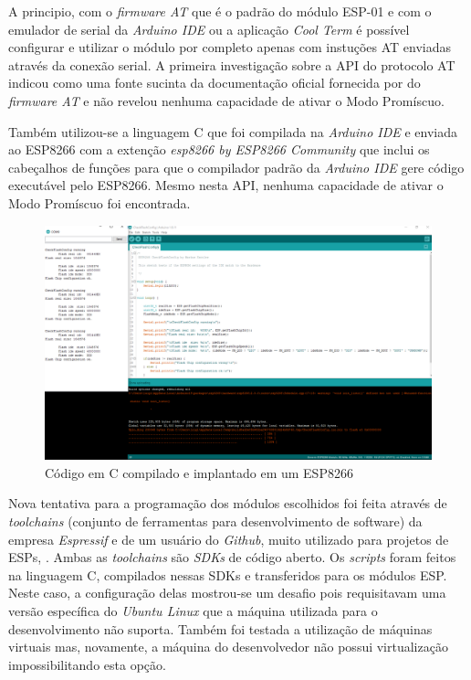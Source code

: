 A principio, com o \emph{firmware AT} que é o padrão do módulo ESP-01 e com o
emulador de serial da \emph{Arduino IDE} ou a aplicação \emph{Cool Term} é
possível configurar e utilizar o módulo por completo apenas com instuções AT
enviadas através da conexão serial. A primeira investigação sobre a API do protocolo
AT indicou  como uma fonte sucinta da documentação
oficial fornecida por  do \emph{firmware AT} e
não revelou nenhuma capacidade de ativar o Modo Promíscuo.

Também utilizou-se a linguagem C que foi compilada na \emph{Arduino IDE} e
enviada ao ESP8266 com a extenção \emph{esp8266 by ESP8266 Community} que inclui
os cabeçalhos de funções para que o compilador padrão da \emph{Arduino IDE} gere
código  executável pelo ESP8266. Mesmo nesta API, nenhuma capacidade de ativar o
Modo Promíscuo foi encontrada.

\begin{figure}[htb]
	\caption{\label{fig:esp-arduino}Código em C compilado e implantado em um ESP8266}
	\begin{center}
		\includegraphics[width=1\textwidth]{040-plataformas/esp-dev/arduino-ide.png}
	\end{center}
\end{figure}


Nova tentativa para a programação  dos módulos escolhidos foi feita através de
\emph{toolchains} (conjunto de ferramentas para desenvolvimento de software) da
empresa \emph{Espressif} e de um usuário do \emph{Github}, muito utilizado para
projetos de ESPs, . Ambas as \emph{toolchains}
são \emph{SDKs} de código aberto. Os \emph{scripts} foram feitos na linguagem C,
compilados nessas SDKs e transferidos para os módulos ESP. Neste caso,
a configuração delas mostrou-se um desafio pois requisitavam uma versão
específica do \emph{Ubuntu Linux} que a máquina utilizada para o desenvolvimento
não suporta. Também foi testada a utilização de máquinas virtuais mas, novamente,
a máquina do desenvolvedor não possui virtualização impossibilitando esta opção.

